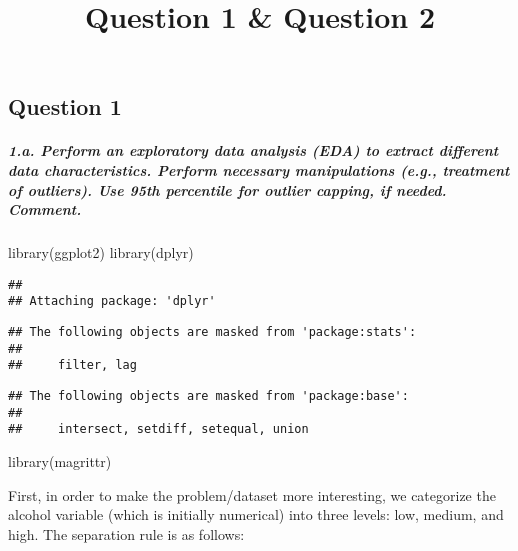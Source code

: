 \documentclass[
]{article}
\title{Question 1 \& Question 2}
\author{}
\date{\vspace{-2.5em}}
\newenvironment{Shaded}{\begin{snugshade}}{\end{snugshade}}
\newcommand{\FunctionTok}[1]{\textcolor[rgb]{0.00,0.00,0.00}{#1}}
\newcommand{\NormalTok}[1]{#1}
\begin{document}
\maketitle

\hypertarget{question-1}{%
\subsection{Question 1}\label{question-1}}

\hypertarget{a.-perform-an-exploratory-data-analysis-eda-to-extract-different-data-characteristics.-perform-necessary-manipulations-e.g.-treatment-of-outliers.-use-95th-percentile-for-outlier-capping-if-needed.-comment.}{%
\subparagraph{1.a. Perform an exploratory data analysis (EDA) to extract
different data characteristics. Perform necessary manipulations (e.g.,
treatment of outliers). Use 95th percentile for outlier capping, if
needed.
Comment.}\label{a.-perform-an-exploratory-data-analysis-eda-to-extract-different-data-characteristics.-perform-necessary-manipulations-e.g.-treatment-of-outliers.-use-95th-percentile-for-outlier-capping-if-needed.-comment.}}

\begin{Shaded}
\begin{Highlighting}[]
\FunctionTok{library}\NormalTok{(ggplot2)}
\FunctionTok{library}\NormalTok{(dplyr)}
\end{Highlighting}
\end{Shaded}

\begin{verbatim}
## 
## Attaching package: 'dplyr'
\end{verbatim}

\begin{verbatim}
## The following objects are masked from 'package:stats':
## 
##     filter, lag
\end{verbatim}

\begin{verbatim}
## The following objects are masked from 'package:base':
## 
##     intersect, setdiff, setequal, union
\end{verbatim}

\begin{Shaded}
\begin{Highlighting}[]
\FunctionTok{library}\NormalTok{(magrittr)}
\end{Highlighting}
\end{Shaded}

First, in order to make the problem/dataset more interesting, we
categorize the alcohol variable (which is initially numerical) into
three levels: low, medium, and high. The separation rule is as follows:
\end{document}
